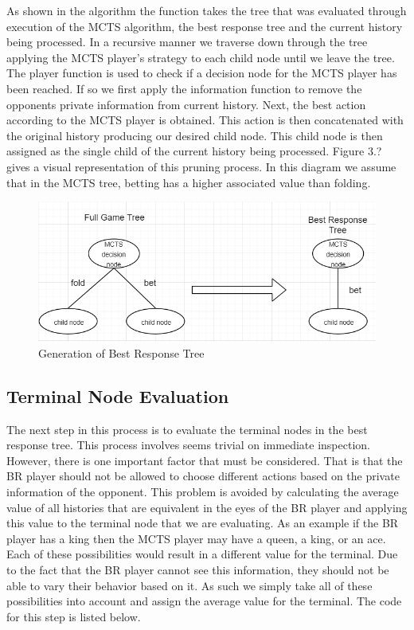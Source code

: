 As shown in the algorithm the function takes the tree that was evaluated
through execution of the MCTS algorithm, the best response tree and the current history being processed.
In a recursive manner we traverse down through the tree applying the MCTS player's
strategy to each child node until we leave the tree.
The player function is used to check if a decision node for the MCTS player has been reached.
If so we first apply the information function to remove the opponents private information from current history.
Next, the best action according to the MCTS player is obtained.
This action is then concatenated with the original history producing our desired child node.
This child node is then assigned as the single child of the current history being processed.
Figure 3.? gives a visual representation of this pruning process.
In this diagram we assume that in the MCTS tree, betting has a higher associated value than folding.

\begin{figure}
    \includegraphics[scale=1]{images/best_response_tree_vs_full_tree.PNG}
    \caption{Generation of Best Response Tree}
\end{figure}

\subsection{Terminal Node Evaluation}\label{subsec:terminalNodeEvaluation}
The next step in this process is to evaluate the terminal nodes in the best response tree.
This process involves seems trivial on immediate inspection.
However, there is one important factor that must be considered.
That is that the BR player should not be allowed to choose different actions based on the
private information of the opponent.
This problem is avoided by calculating the average value of all histories that are equivalent in
the eyes of the BR player and applying this value to the terminal node that we are evaluating.
As an example if the BR player has a king then the MCTS player may have a queen, a king, or an ace.
Each of these possibilities would result in a different value for the terminal.
Due to the fact that the BR player cannot see this information, they should not be able to vary
their behavior based on it.
As such we simply take all of these possibilities into account and assign the average value for
the terminal.
The code for this step is listed below.


